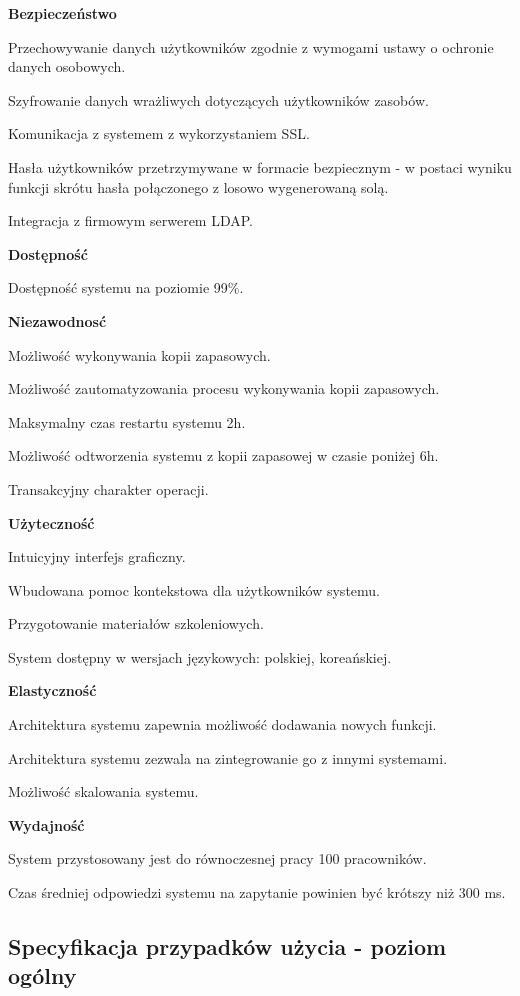 \begin{myEnumerate}
	\item \textbf{Bezpieczeństwo}
	\begin{myEnumerate}
		\item Przechowywanie danych użytkowników zgodnie z wymogami ustawy o ochronie danych osobowych.
		\item Szyfrowanie danych wrażliwych dotyczących użytkowników zasobów.
		\item Komunikacja z systemem z wykorzystaniem SSL.
		\item Hasła użytkowników przetrzymywane w formacie bezpiecznym - w postaci wyniku funkcji skrótu hasła połączonego z losowo wygenerowaną solą.
		\item Integracja z firmowym serwerem LDAP.
	\end{myEnumerate}
	\item \textbf{Dostępność}
	\begin{myEnumerate}
		\item Dostępność systemu na poziomie 99\%.
	\end{myEnumerate}
	\item \textbf{Niezawodnosć}
	\begin{myEnumerate}
		\item Możliwość wykonywania kopii zapasowych.
		\item Możliwość zautomatyzowania procesu wykonywania kopii zapasowych.
		\item Maksymalny czas restartu systemu 2h.
		\item Możliwość odtworzenia systemu z kopii zapasowej w czasie poniżej 6h.
		\item Transakcyjny charakter operacji.
	\end{myEnumerate}
	\item \textbf{Użyteczność}
	\begin{myEnumerate}
		\item Intuicyjny interfejs graficzny.
		\item Wbudowana pomoc kontekstowa dla użytkowników systemu.
		\item Przygotowanie materiałów szkoleniowych.
		\item System dostępny w wersjach językowych: polskiej, koreańskiej.
	\end{myEnumerate}
	\item \textbf{Elastyczność}
	\begin{myEnumerate}
		\item Architektura systemu zapewnia możliwość dodawania nowych funkcji.
		\item Architektura systemu zezwala na zintegrowanie go z innymi systemami.
		\item Możliwość skalowania systemu.
	\end{myEnumerate}
	\item \textbf{Wydajność}
	\begin{myEnumerate}
		\item System przystosowany jest do równoczesnej pracy 100 pracowników.
		\item Czas średniej odpowiedzi systemu na zapytanie powinien być krótszy niż 300 ms.
	\end{myEnumerate}
\end{myEnumerate}

\subsection{Specyfikacja przypadków użycia - poziom ogólny}
